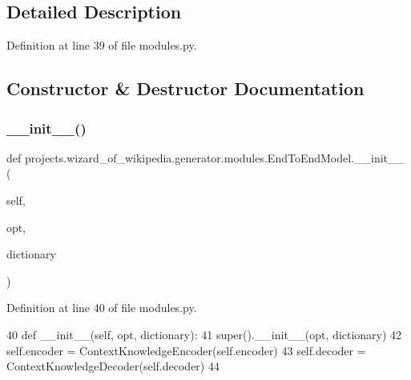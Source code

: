 \subsection{Detailed Description}


Definition at line 39 of file modules.\+py.



\subsection{Constructor \& Destructor Documentation}
\mbox{\label{classprojects_1_1wizard__of__wikipedia_1_1generator_1_1modules_1_1EndToEndModel_a247a986cf18f9711f93d2336d653779e}} 
\subsubsection{\texorpdfstring{\+\_\+\+\_\+init\+\_\+\+\_\+()}{\_\_init\_\_()}}
{\footnotesize\ttfamily def projects.\+wizard\+\_\+of\+\_\+wikipedia.\+generator.\+modules.\+End\+To\+End\+Model.\+\_\+\+\_\+init\+\_\+\+\_\+ (\begin{DoxyParamCaption}\item[{}]{self,  }\item[{}]{opt,  }\item[{}]{dictionary }\end{DoxyParamCaption})}



Definition at line 40 of file modules.\+py.


\begin{DoxyCode}
40     \textcolor{keyword}{def }\_\_init\_\_(self, opt, dictionary):
41         super().\_\_init\_\_(opt, dictionary)
42         self.encoder = ContextKnowledgeEncoder(self.encoder)
43         self.decoder = ContextKnowledgeDecoder(self.decoder)
44 
\end{DoxyCode}


